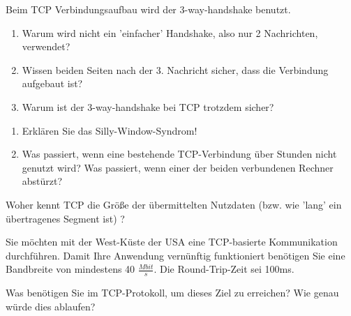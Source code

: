 
Beim TCP Verbindungsaufbau wird der 3-way-handshake benutzt.
\begin{enumerate}
    \item Warum wird nicht ein 'einfacher' Handshake, also nur 2 Nachrichten, verwendet?
    \item Wissen beiden Seiten nach der 3. Nachricht sicher, dass die Verbindung aufgebaut ist?
    \item Warum ist der 3-way-handshake bei TCP trotzdem sicher?
\end{enumerate}

\begin{enumerate}
    \item Erklären Sie das Silly-Window-Syndrom!
    \item Was passiert, wenn eine bestehende TCP-Verbindung über Stunden nicht genutzt wird? Was passiert, wenn einer der beiden verbundenen Rechner abstürzt?
\end{enumerate}

Woher kennt TCP die Größe der übermittelten Nutzdaten (bzw. wie 'lang' ein übertragenes Segment ist) ?

Sie möchten mit der West-Küste der USA eine TCP-basierte Kommunikation durchführen.
Damit Ihre Anwendung vernünftig funktioniert benötigen Sie eine Bandbreite von mindestens 40 $\frac{Mbit}{s}$.
Die Round-Trip-Zeit sei 100ms.

Was benötigen Sie im TCP-Protokoll, um dieses Ziel zu erreichen?
Wie genau würde dies ablaufen?